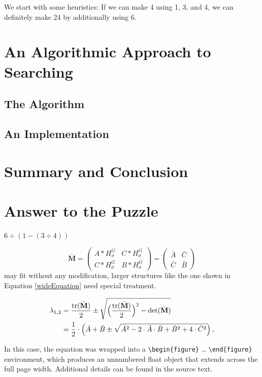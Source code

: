 \documentclass[english,smartquotes]{hgbarticle}
\begin{document}
We start with some heuristics: If we can make 4 using 1, 3, and 4, we can definitely make 24 by additionally using 6. 

\section{An Algorithmic Approach to Searching}
\subsection{The Algorithm}
\subsection{An Implementation}
\section{Summary and Conclusion}

\section{Answer to the Puzzle}
\begin{rotanswer}
$6\div(1-(3\div 4))$
\end{rotanswer}

%
\begin{equation}
\bar{\mathbf{M}} =  
\begin{pmatrix}
	A \ast H^{G}_{\sigma}   & C \ast H^{G}_{\sigma} \\
	C \ast H^{G}_{\sigma}   & B \ast H^{G}_{\sigma} 
\end{pmatrix}
=
\begin{pmatrix}
	\bar{A}   & \bar{C} \\
	\bar{C}   & \bar{B} 
\end{pmatrix}
\end{equation}
%
may fit without any modification, larger structures like the one shown in
Equation \ref{wideEquation} need special treatment.
%
\begin{figure}[t]
	\begin{equation}
		\begin{split}
			\lambda_{1,2}
			&= \frac{\mathrm{tr}(\bar{\mathbf{M}})}{2} \pm \sqrt{\Bigl
			(\frac{\mathrm{tr}(\bar{\mathbf{M}})}{2}\Bigr)^2
			- \mathrm{det}(\bar{\mathbf{M}})}  \\
			&= \frac{1}{2} \cdot \left( \bar{A} + \bar{B} \pm \sqrt{\bar{A}^2 -
			2 \cdot \bar{A} \cdot \bar{B} + \bar{B}^2 + 4 \cdot \bar{C}^2}
			\right)
			,
		\end{split}
		\label{wideEquation}
	\end{equation}
\end{figure}
%
In this case, the equation was wrapped into a \verb!\begin{figure}! \ldots
\verb!\end{figure}! environment, which produces an unnumbered float object
that extends across the full page width. Additional details can be found in
the source text.
\end{document}
